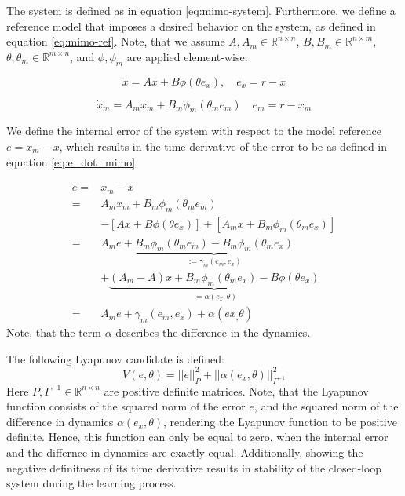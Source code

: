 The system is defined as in equation \eqref{eq:mimo-system}. Furthermore, we define a reference model that imposes a desired behavior on the system, as defined in equation \eqref{eq:mimo-ref}. Note, that we assume $A,A_m\in\mathbb{R}^{n \times n}$, $B,B_m\in\mathbb{R}^{n\times m}$, $\theta,\theta_m\in\mathbb{R}^{m\times n}$, and $\phi, \phi_m$ are applied element-wise.

\begin{equation}
 \dot x = Ax + B\phi(\theta e_x), \quad e_x = r-x
    \label{eq:mimo-system}
\end{equation}

\begin{equation}
 \dot x_m = A_mx_m + B_m\phi_m(\theta_m e_m) \quad e_m = r-x_m
    \label{eq:mimo-ref}
\end{equation}

We define the internal error of the system with respect to the model reference $e=x_m-x$, which results in the time derivative of the error to be as defined in equation \eqref{eq:e_dot_mimo}. 

\begin{equation}
    \begin{aligned}
 \dot e  = & \dot x_m - \dot x \\
         = &  A_mx_m + B_m\phi_m(\theta_m e_m) \\ 
        & - \left[Ax + B\phi(\theta e_x)\right] \pm \left[A_mx + B_m\phi_m(\theta_m e_x)\right] \\
         = & A_m e + \underbrace{B_m\phi_m(\theta_m e_m) - B_m\phi_m(\theta_m e_x)}_{:=\gamma_m(e_m,e_x)} \\
        & + \underbrace{(A_m-A)x + B_m\phi_m(\theta_m e_x) - B\phi(\theta e_x)}_{:=\alpha(e_x,\theta)}\\
        = & A_m e + \gamma_m(e_m,e_x) + \alpha(ex_, \theta)
    \end{aligned}
    \label{eq:e_dot_mimo}
\end{equation}
Note, that the term $\alpha$ describes the difference in the dynamics.

The following Lyapunov candidate is defined:
\begin{equation}
    V(e,\theta) = ||e||_P^2 + ||\alpha(e_x,\theta)||_{\Gamma^{-1}}^2
    \label{eq:lyapunov-candidate-mimo}
\end{equation}
Here $P,\Gamma^{-1}\in\mathbb{R}^{n\times n}$ are positive definite matrices. Note, that the Lyapunov function consists of the squared norm of the error $e$, and the squared norm of the difference in dynamics $\alpha(e_x,\theta)$, rendering the Lyapunov function to be positive definite. Hence, this function can only be equal to zero, when the internal error and the differnce in dynamics are exactly equal. Additionally, showing the negative definitness of its time derivative results in stability of the closed-loop system during the learning process.

